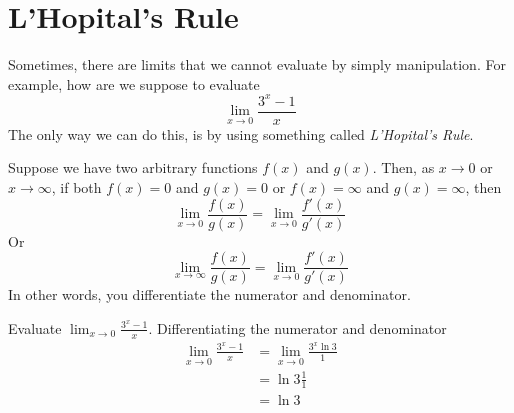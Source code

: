 \documentclass[working]{tuftebook}
\begin{document}
\renewcommand{\thepage}{\arabic{page}}
\pagestyle{plain}
\pagestyle{normal}
\chapter{L'Hopital's Rule}
\vspace{-2em}
Sometimes, there are limits that we cannot evaluate by simply manipulation. For example, how are we suppose to evaluate 
\[
    \lim_{x\to 0} \frac{3^x-1}{x}
\]
The only way we can do this, is by using something called \emph{L'Hopital's Rule}.

\begin{definition}
    Suppose we have two arbitrary functions $f(x)$ and $g(x)$. Then, as $x\to0$ or $x\to\infty$, if both $f(x)=0$ and $g(x)=0$ or $f(x)=\infty$ and $g(x)=\infty$, then 
    \[
        \lim_{x\to 0} \frac{f(x)}{g(x)}= \lim_{x\to 0} \frac{f'(x)}{g'(x)}
    \]
    Or 
    \[
        \lim_{x\to \infty } \frac{f(x)}{g(x)}= \lim_{x\to 0} \frac{f'(x)}{g'(x)}
    \]
    In other words, you differentiate the numerator and denominator.
\end{definition}

\begin{eg}
    Evaluate $\displaystyle \lim_{x\to 0} \frac{3^x-1}{x}$. Differentiating the numerator and denominator 
    \begin{align*}
        \lim_{x\to 0} \frac{3^x-1}{x} &=\lim_{x\to 0} \frac{3^x \ln 3}{1}\\
                                      &= \ln 3 \frac{1}{1}\\ 
                                      &= \ln 3
    \end{align*}
\end{eg}
\end{document}
